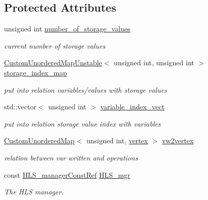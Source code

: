 \subsection*{Protected Attributes}
\begin{DoxyCompactItemize}
\item 
unsigned int \hyperlink{classStorageValueInformation_a3bfe09e2d9557c3554108765579b9372}{number\+\_\+of\+\_\+storage\+\_\+values}
\begin{DoxyCompactList}\small\item\em current number of storage values \end{DoxyCompactList}\item 
\hyperlink{custom__map_8hpp_a8cbaceffc09790a885ec7e9c17809c69}{Custom\+Unordered\+Map\+Unstable}$<$ unsigned int, unsigned int $>$ \hyperlink{classStorageValueInformation_a68d366c305f831df0a0c98ae27dd83c5}{storage\+\_\+index\+\_\+map}
\begin{DoxyCompactList}\small\item\em put into relation variables/values with storage values \end{DoxyCompactList}\item 
std\+::vector$<$ unsigned int $>$ \hyperlink{classStorageValueInformation_aeff413536430335a40fd77b8271396d5}{variable\+\_\+index\+\_\+vect}
\begin{DoxyCompactList}\small\item\em put into relation storage value index with variables \end{DoxyCompactList}\item 
\hyperlink{custom__map_8hpp_ad1ed68f2ff093683ab1a33522b144adc}{Custom\+Unordered\+Map}$<$ unsigned int, \hyperlink{graph_8hpp_abefdcf0544e601805af44eca032cca14}{vertex} $>$ \hyperlink{classStorageValueInformation_a07563c0af438986143be9c4103f3e6ea}{vw2vertex}
\begin{DoxyCompactList}\small\item\em relation between var written and operations \end{DoxyCompactList}\item 
const \hyperlink{hls__manager_8hpp_a1b481383e3beabc89bd7562ae672dd8c}{H\+L\+S\+\_\+manager\+Const\+Ref} \hyperlink{classStorageValueInformation_aa60471f4fd3f3c6ca9a2ec472de3de48}{H\+L\+S\+\_\+mgr}
\begin{DoxyCompactList}\small\item\em The H\+LS manager. \end{DoxyCompactList}\item 

\end{DoxyCompactItemize}
